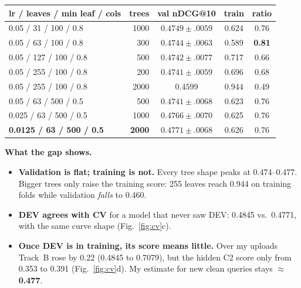 \documentclass[10pt,a4paper]{article}
\begin{document}
\begin{minipage}[t]{0.47\textwidth}
\vspace{0pt}
\centering\footnotesize
\begin{tabular}{@{}lrccc@{}}
\toprule
lr / leaves / min leaf / cols & trees & val nDCG@10 & train & ratio\\
\midrule
0.05 / 31 / 100 / 0.8 & 1000 & $0.4749\pm.0059$ & 0.624 & 0.76\\
0.05 / 63 / 100 / 0.8 & 300 & $0.4744\pm.0063$ & 0.589 & \textbf{0.81}\\
0.05 / 127 / 100 / 0.8 & 500 & $0.4742\pm.0077$ & 0.717 & 0.66\\
0.05 / 255 / 100 / 0.8 & 200 & $0.4741\pm.0059$ & 0.696 & 0.68\\
0.05 / 255 / 100 / 0.8 & 2000 & $0.4599$ & 0.944 & 0.49\\
0.05 / 63 / 500 / 0.5 & 500 & $0.4741\pm.0068$ & 0.623 & 0.76\\
0.025 / 63 / 500 / 0.5 & 1000 & $0.4766\pm.0070$ & 0.625 & 0.76\\
\textbf{0.0125 / 63 / 500 / 0.5} & \textbf{2000} & $\mathbf{0.4771\pm.0068}$ & 0.626 & 0.76\\
\bottomrule
\end{tabular}
\label{tab:cv}
\end{minipage}\hfill
\begin{minipage}[t]{0.505\textwidth}
\vspace{0pt}
\textbf{What the gap shows.}
\begin{itemize}
\item \textbf{Validation is flat; training is not.} Every tree shape peaks at 0.474--0.477. Bigger trees only raise the training score: 255 leaves reach 0.944 on training folds while validation \emph{falls} to 0.460.
\item \textbf{DEV agrees with CV} for a model that never saw DEV: 0.4845 vs.\ 0.4771, with the same curve shape (Fig.~\ref{fig:cv}c).
\item \textbf{Once DEV is in training, its score means little.} Over my uploads Track~B rose by 0.22 (0.4845 to 0.7079), but the hidden C2 score only from 0.353 to 0.391 (Fig.~\ref{fig:cv}d). My estimate for new clean queries stays \textbf{$\approx$0.477}.
\end{itemize}
\end{minipage}

\end{document}
